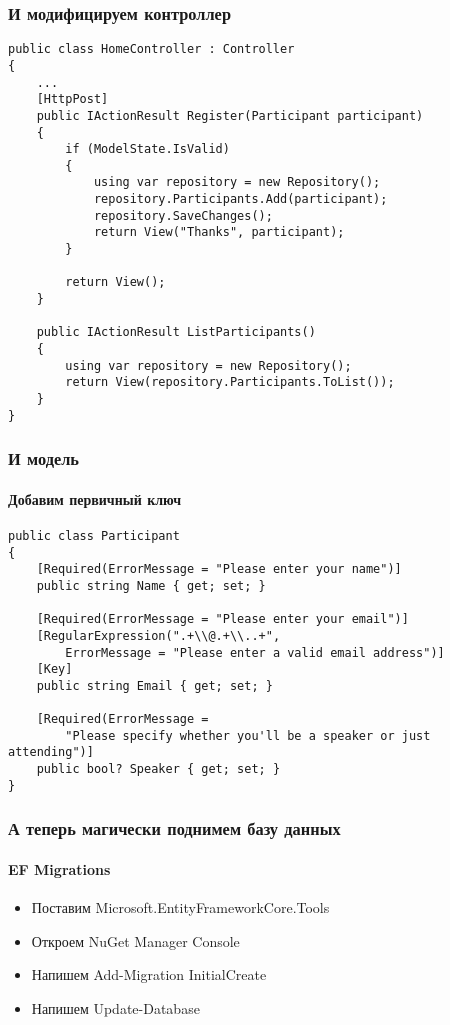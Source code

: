 \documentclass[xetex,mathserif,serif]{beamer}
\begin{document}
    \begin{frame}[fragile]
        \frametitle{И модифицируем контроллер}
        \begin{scriptsize}
            \begin{verbatim}
public class HomeController : Controller
{
    ...
    [HttpPost]
    public IActionResult Register(Participant participant)
    {
        if (ModelState.IsValid)
        {
            using var repository = new Repository();
            repository.Participants.Add(participant);
            repository.SaveChanges();
            return View("Thanks", participant);
        }

        return View();
    }

    public IActionResult ListParticipants()
    {
        using var repository = new Repository();
        return View(repository.Participants.ToList());
    }
}  
            \end{verbatim}
        \end{scriptsize}
    \end{frame}

    \begin{frame}[fragile]
        \frametitle{И модель}
        \framesubtitle{Добавим первичный ключ}
        \begin{small}
            \begin{verbatim}
public class Participant
{
    [Required(ErrorMessage = "Please enter your name")]
    public string Name { get; set; }

    [Required(ErrorMessage = "Please enter your email")]
    [RegularExpression(".+\\@.+\\..+", 
        ErrorMessage = "Please enter a valid email address")]
    [Key]
    public string Email { get; set; }

    [Required(ErrorMessage = 
        "Please specify whether you'll be a speaker or just attending")]
    public bool? Speaker { get; set; }
}
            \end{verbatim}
        \end{small}
    \end{frame}

    \begin{frame}
        \frametitle{А теперь магически поднимем базу данных}
        \framesubtitle{EF Migrations}
        \begin{itemize}
            \item Поставим Microsoft.EntityFrameworkCore.Tools
            \item Откроем NuGet Manager Console
            \item Напишем Add-Migration InitialCreate
            \item Напишем Update-Database
        \end{itemize}
    \end{frame}
\end{document}

